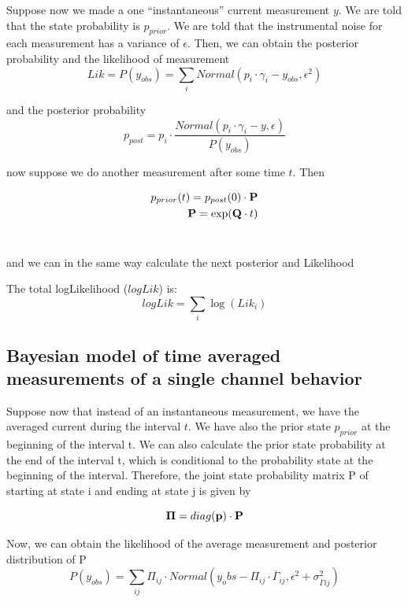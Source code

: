 \documentclass[pdflatex,sn-mathphys-num]{sn-jnl}%
\theoremstyle{thmstyleone}%
\theoremstyle{thmstyletwo}%
\theoremstyle{thmstylethree}%
\begin{document}
Suppose now we made a one ``instantaneous'' current measurement $y$. We are told that the state
 probability is $p_{prior}$. We are told that the instrumental noise for each measurement has a variance of $\epsilon$. 
Then, we can obtain the posterior probability and the likelihood of measurement 
\begin{equation}
Lik=P(y_{obs})= \sum_i Normal (p_i \cdot \gamma_i - y_{obs}, \epsilon^2 ) 
\end{equation}

 and the posterior probability
\begin{equation}
p_{post} = p_i \cdot \frac {Normal(p_i \cdot \gamma_i -y, \epsilon)}{P(y_{obs})}
\end{equation}

now suppose we do another measurement after some time $t$. Then 

\begin{align}
p_{prior}(t) = p_{post}(0) \cdot \bold P  \nonumber \\
\bold P = \exp(\bold Q \cdot t)
\end{align}
\ 

and we can in the same way calculate the next posterior and Likelihood

The total logLikelihood ($logLik$) is:
\begin{equation}
logLik= \sum_i \log(Lik_i)
\end{equation}

 


\subsection{Bayesian model of time averaged measurements of a single channel behavior}
Suppose now that instead of an instantaneous measurement, we have the averaged current during the interval $t$. 
We have also the prior state $p_{prior}$ at the beginning of the interval t. We can also calculate the prior state probability at the end of the interval t, which is conditional to the probability state at the beginning of the interval. Therefore, the joint state probability matrix P  of starting at state i and ending at state j is given by

\begin{equation}
\bold \Pi  = diag (\bold p) \cdot \bold P
\end{equation}

Now, we can obtain the likelihood of the average measurement and posterior distribution of P 
\begin{equation}
P(y_{obs}) =\sum_{ij} \Pi_{ij} \cdot Normal \left(y_obs-{\Pi_{ij} \cdot {\overline \Gamma}_{ij}} , \epsilon^2 + \sigma^2_{\overline{\Gamma} ij} \right)
\end{equation}
\end{document}
